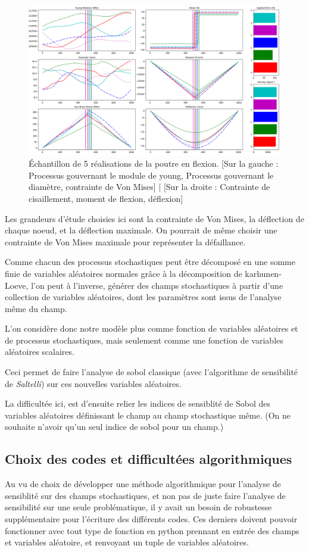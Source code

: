 \documentclass[a4paper,10pt]{article}
\begin{document}
\begin{figure}[H]
   \centering   
   \includegraphics[scale=0.33]{beam_experience.png}
      \caption{Échantillon de 5 réalisations de la poutre en flexion. [Sur la gauche : Processus gouvernant le module de young, Processus gouvernant le diamètre, contrainte de Von Mises] | [Sur la droite : Contrainte de cisaillement, moment de flexion, déflexion] }
         \label{beamExperience}
\end{figure}

Les grandeurs d'étude choisies ici sont la contrainte de Von Mises, la déflection de chaque noeud, et la déflection maximale. On pourrait de même choisir une contrainte de Von Mises maximale pour représenter la défaillance. 

Comme chacun des processus stochastiques peut être décomposé en une somme finie de variables aléatoires normales grâce à la décomposition de karhunen-Loeve, l'on peut à l'inverse, générer des champs stochastiques à partir d'une collection de variables aléatoires, dont les paramètres sont issus de l'analyse même du champ.

L'on considère donc notre modèle plus comme fonction de variables aléatoires et de processus stochastiques, mais seulement comme une fonction de variables aléatoires scalaires.

Ceci permet de faire l'analyse de sobol classique (avec l'algorithme de sensibilité de \textit{Saltelli}) sur ces nouvelles variables aléatoires.

La difficultée ici, est d'ensuite relier les indices de sensiblité de Sobol des variables aléatoires définissant le champ au champ stochastique même. (On ne souhaite n'avoir qu'un seul indice de sobol pour un champ.) 

\subsection{Choix des codes et difficultées algorithmiques}
Au vu de choix de développer une méthode algorithmique pour l'analyse de sensiblité sur des champs stochastiques, et non pas de juste faire l'analyse de sensibilité sur une seule problématique, il y avait un besoin de robustesse supplémentaire pour l'écriture des différents codes. Ces derniers doivent pouvoir fonctionner avec tout type de fonction en python prennant en entrée des champs et variables aléatoire, et renvoyant un tuple de variables aléatoires. 
\end{document}
